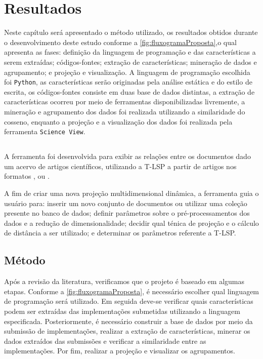 \chapter{Resultados}
\label{chap:Result}

	Neste capítulo será apresentado o método utilizado, os resultados obtidos durante
	o desenvolvimento deste estudo conforme a \cref{fig:fluxogramaProposta},o qual
	apresenta as fases: definição da linguagem de programação e das características
	a serem extraídas; códigos-fontes; extração de características; mineração de dados e
	agrupamento; e projeção e visualização. A linguagem de programação escolhida foi \texttt{Python},
	as características serão originadas pela análise estática e do estilo de escrita,
	os códigos-fontes consiste em duas base de dados distintas, a extração
	de características ocorreu por meio de ferramentas disponibilizadas livremente, a
	mineração e agrupamento dos dados foi realizada utilizando a similaridade do
	cosseno, enquanto a projeção e a visualização dos dados foi realizada pela ferramenta
	\texttt{Science View}.
	 
	\section{}
		A ferramenta  \cite{Alencar} foi desenvolvida para exibir
		as relações entre os documentos dado um acervo de artigos científicos, utilizando
		a \acs{T-LSP} a partir de artigos nos formatos , 
		ou .
		
		A fim de criar uma nova projeção multidimensional dinâmica, a ferramenta guia o usuário
		para: inserir um novo conjunto de documentos ou utilizar uma coleção presente no banco
		de dados; definir parâmetros sobre o pré-processamentos dos dados e a redução de
		dimensionalidade; decidir qual ténica de projeção e o cálculo de distância a ser utilizado;
		e determinar os parâmetros referente a \acs{T-LSP}.


 	\section{Método}
	 	Após a revisão da literatura, verificamos que o projeto é baseado em algumas etapas.
	 	Conforme a \cref{fig:fluxogramaProposta}, é necessário escolher qual linguagem de programação
	 	será utilizado. Em seguida deve-se verificar quais características podem ser extraídas
	 	das implementações submetidas utilizando a linguagem especificada. Posteriormente, é
	 	necessário construir a base de dados por meio da submissão de implementações, realizar
	 	a extração de características, minerar os dados extraídos das submissões e verificar a
	 	similaridade entre as implementações. Por fim, realizar a projeção e visualizar os
	 	agrupamentos.
	 	
